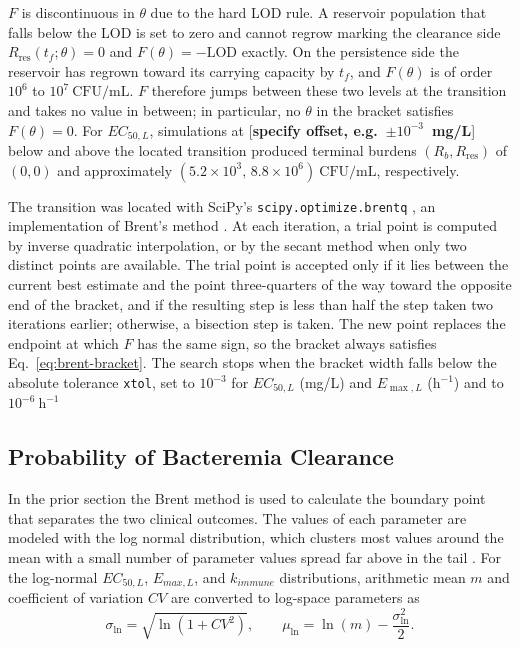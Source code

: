 \documentclass[12pt, draftcls, onecolumn]{IEEEtran}
\begin{document}
$F$ is discontinuous in $\theta$ due to the hard LOD rule. A reservoir
population that falls below the LOD is set to zero and cannot regrow marking
the clearance side $R_{\mathrm{res}}(t_f;\theta) = 0$ and
$F(\theta) = -\mathrm{LOD}$ exactly. On the persistence side the reservoir has
regrown toward its carrying capacity by $t_f$, and $F(\theta)$ is of order
$10^{6}$ to $10^{7}~\mathrm{CFU/mL}$. $F$ therefore jumps between these two
levels at the transition and takes no value in between; in particular, no
$\theta$ in the bracket satisfies $F(\theta) = 0$. For $EC_{50,L}$, simulations
at [\textbf{specify offset, e.g.\ $\pm 10^{-3}$~mg/L}] below and above the
located transition produced terminal burdens $(R_b, R_{\mathrm{res}})$ of
$(0,0)$ and approximately $(5.2 \times 10^{3},\, 8.8 \times 10^{6})~\mathrm{CFU/mL}$,
respectively.

The transition was located with SciPy's \texttt{scipy.optimize.brentq}
\cite{2020SciPy-NMeth}, an implementation of Brent's method
\cite{Brent1971,brent1973}. At each iteration, a trial point is computed by
inverse quadratic interpolation, or by the secant method when only two
distinct points are available. The trial point is accepted only if it lies
between the current best estimate and the point three-quarters of the way
toward the opposite end of the bracket, and if the resulting step is less than
half the step taken two iterations earlier; otherwise, a bisection step is
taken. The new point replaces the endpoint at which $F$ has the same sign, so
the bracket always satisfies Eq.~\eqref{eq:brent-bracket}. The search stops
when the bracket width falls below the absolute tolerance \texttt{xtol}, set
to $10^{-3}$ for $EC_{50,L}$ (mg/L) and $E_{\max,L}$ ($\mathrm{h}^{-1}$) and to
$10^{-6}~\mathrm{h}^{-1}$



\subsection{Probability of Bacteremia Clearance }
In the prior section the Brent method is used to calculate the boundary point that separates the two clinical outcomes.
The values of each parameter are modeled with the log normal distribution, which clusters most values around
the mean with a small number of parameter values spread far above in the tail \cite{limpert2001lognormal}. For the log-normal $EC_{50,L}$, $E_{max,L}$, and $k_{immune}$ distributions, arithmetic mean $m$ and coefficient of variation $CV$ are converted to log-space
parameters as
\begin{equation}
\sigma_{\ln}=\sqrt{\ln(1+CV^2)}, \qquad
\mu_{\ln}=\ln(m)-\frac{\sigma_{\ln}^{2}}{2}.
\label{eq:lognormal-parameters}
\end{equation}
\end{document}
